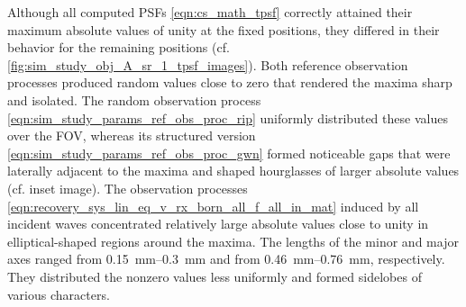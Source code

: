 Although
all computed \acp{PSF}
\eqref{eqn:cs_math_tpsf} correctly attained
their maximum absolute values of
unity at
the fixed positions,
they differed in
their behavior for
the remaining positions
(cf. \cref{fig:sim_study_obj_A_sr_1_tpsf_images}).
Both reference observation processes produced
random values close to
zero that rendered
the maxima sharp and
isolated.
The random observation process
\eqref{eqn:sim_study_params_ref_obs_proc_rip} uniformly distributed
these values over
the \ac{FOV}, whereas
its structured version
\eqref{eqn:sim_study_params_ref_obs_proc_gwn} formed
noticeable gaps that were
laterally adjacent to
the maxima and shaped
hourglasses of
larger absolute values
(cf. inset image).
The observation processes
\eqref{eqn:recovery_sys_lin_eq_v_rx_born_all_f_all_in_mat} induced by
all incident waves concentrated
relatively large absolute values close to
unity in
elliptical-shaped regions around
the maxima.
The lengths of
the minor and major axes ranged from
\SIrange{0.15}{0.3}{\milli\meter} and from
\SIrange{0.46}{0.76}{\milli\meter},
respectively.
They distributed
the nonzero values less uniformly and formed
sidelobes of
various characters.

